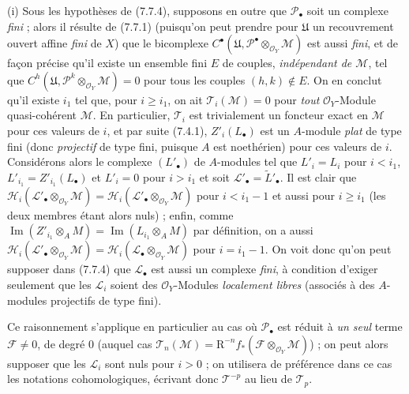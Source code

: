 \begin{remarks}[7.7.12]
\textnormal{(i)} Sous les hypothèses de (7.7.4), supposons en outre que
$\mathscr P_\bullet$ soit un complexe \emph{fini} ; alors il résulte de (7.7.1)
(puisqu'on peut prendre pour $\mathfrak U$ un recouvrement ouvert affine
\emph{fini} de $X$) que le bicomplexe
$C^\bullet(\mathfrak U,\mathscr P^\bullet\otimes_{\mathscr O_Y}\mathscr M)$ est
aussi \emph{fini}, et de façon précise qu'il existe un ensemble fini $E$ de couples,
\emph{indépendant de $\mathscr M$}, tel que
$C^h(\mathfrak U,\mathscr P^k\otimes_{\mathscr O_Y}\mathscr M)=0$ pour tous les couples $(h,k)\notin E$.
On en conclut qu'il existe $i_1$ tel que, pour $i\geq i_1$, on ait
$\mathscr T_i(\mathscr M)=0$ pour \emph{tout} $\mathscr O_Y$-Module
quasi-cohérent $\mathscr M$. En particulier, $\mathscr T_i$ est trivialement un
foncteur exact en $\mathscr M$ pour ces valeurs de $i$, et par suite (7.4.1),
$Z'_i(L_\bullet)$ est un $A$-module \emph{plat} de type fini (donc
\emph{projectif} de type fini, puisque $A$ est noethérien) pour ces valeurs de
$i$. Considérons alors le complexe $(L'_\bullet)$ de $A$-modules tel que
$L'_i=L_i$ pour $i<i_1$, $L'_{i_1}=Z'_{i_1}(L_\bullet)$ et $L'_i=0$ pour
$i>i_1$ et soit $\mathscr L'_\bullet=\widetilde{L}'_\bullet$. Il est clair que
$  \mathscr H_i(\mathscr L'_\bullet\otimes_{\mathscr O_Y}\mathscr M)
  =
  \mathscr H_i(\mathscr L'_\bullet\otimes_{\mathscr O_Y}\mathscr M)$
pour $i<i_1-1$ et aussi pour $i\geq i_1$ (les deux membres étant alors nuls) ;
enfin, comme
$\operatorname{Im}(Z'_{i_1}\otimes_A M)=\operatorname{Im}(L_{i_1}\otimes_A M)$
par définition, on a aussi
$\mathscr H_i(\mathscr L'_\bullet\otimes_{\mathscr O_Y}\mathscr M)
=\mathscr H_i(\mathscr L_\bullet\otimes_{\mathscr O_Y}\mathscr M)$ pour
$i=i_1-1$. On voit donc qu'on peut supposer dans (7.7.4) que
$\mathscr L_\bullet$ est aussi un complexe \emph{fini}, à condition d'exiger
seulement que les $\mathscr L_i$ soient des $\mathscr O_Y$-Modules
\emph{localement libres} (associés à des $A$-modules projectifs de type fini).

Ce raisonnement s'applique en particulier au cas où $\mathscr P_\bullet$ est
réduit à \emph{un seul} terme $\mathscr F\ne0$, de degré 0 (auquel cas
$\mathscr T_n(\mathscr M)=\mathrm R^{-n}f_*
(\mathscr F\otimes_{\mathscr O_Y}\mathscr M)$) ; on peut alors supposer que les
$\mathscr L_i$ sont nuls pour $i>0$ ; on utilisera de préférence dans ce cas les
notations cohomologiques, écrivant donc $\mathscr T^{-p}$ au lieu de
$\mathscr T_p$.


\end{remarks}
